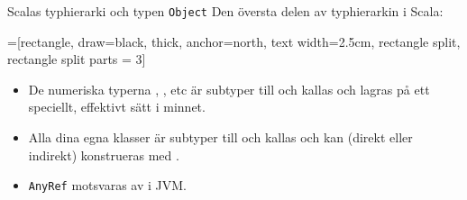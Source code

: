 \begin{Slide}{Scalas typhierarki och typen \texttt{Object}}
Den översta delen av typhierarkin i Scala:
\vspace{1em}
\begin{center}
\newcommand{\TextBox}[1]{\raisebox{0pt}[1em][0.5em]{#1}}
=[rectangle, draw=black,  thick, anchor=north, text width=2.5cm, rectangle split, rectangle split parts = 3]
\end{center}
\begin{itemize}\SlideFontSmall
\item De numeriska typerna , , etc är subtyper till  och kallas  och lagras på ett speciellt, effektivt sätt i minnet.
\item Alla dina egna klasser är subtyper till  och kallas  och kan (direkt eller indirekt) konstrueras med .
\item \texttt{AnyRef} motsvaras av  i JVM.
\end{itemize}
\end{Slide}




